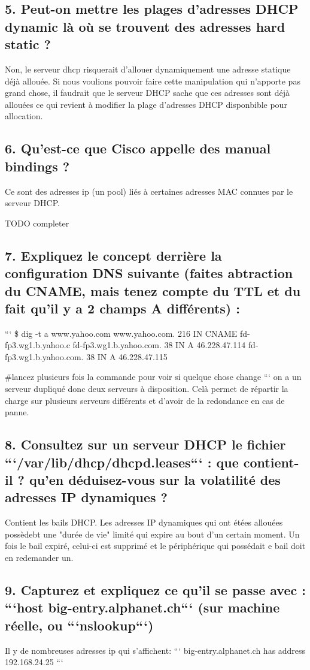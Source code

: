 \documentclass{article}
\begin{document}
\subsection*{5. Peut-on mettre les plages d’adresses DHCP dynamic là où se trouvent des adresses hard static ?}
Non, le serveur dhcp risquerait d'allouer dynamiquement une adresse statique déjà allouée. Si nous voulions pouvoir faire cette manipulation qui n'apporte pas grand chose, il faudrait que le serveur DHCP sache que ces adresses sont déjà allouées ce qui revient à modifier la plage d'adresses DHCP disponbible pour allocation.

\subsection*{6. Qu’est-ce que Cisco appelle des manual bindings ?}
Ce sont des adresses ip (un pool) liés à certaines adresses MAC connues par le serveur DHCP.

TODO completer

\subsection*{7. Expliquez le concept derrière la configuration DNS suivante (faites abtraction du CNAME, mais tenez compte du TTL et du fait qu’il y a 2 champs A différents) :}
```
\$ dig -t a www.yahoo.com
www.yahoo.com.            216   IN    CNAME   fd-fp3.wg1.b.yahoo.c
fd-fp3.wg1.b.yahoo.com.   38    IN    A       46.228.47.114
fd-fp3.wg1.b.yahoo.com.   38    IN    A       46.228.47.115

\#lancez plusieurs fois la commande pour voir si quelque chose change
```
on a un serveur dupliqué donc deux serveurs à disposition. Celà permet de répartir la charge sur plusieurs serveurs différents et d'avoir de la redondance en cas de panne.

\subsection*{8. Consultez sur un serveur DHCP le fichier ```/var/lib/dhcp/dhcpd.leases``` : que contient-il ? qu’en déduisez-vous sur la volatilité des adresses IP dynamiques ?}
Contient les bails DHCP. Les adresses IP dynamiques qui ont étées allouées possèdebt une "durée de vie" limité qui expire au bout d'un certain moment. Un fois le bail expiré, celui-ci est supprimé et le périphérique qui possédait e bail doit en redemander un.

\subsection*{9. Capturez et expliquez ce qu’il se passe avec : ```host big-entry.alphanet.ch``` (sur machine réelle, ou ```nslookup```)}
Il y de nombreuses adresses ip qui s'affichent:
```
big-entry.alphanet.ch has address 192.168.24.25
```
\end{document}
